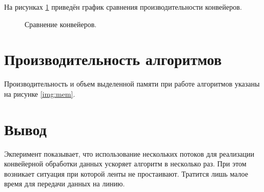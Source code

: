 На рисунках \ref{plt:time} приведён график сравнения производительности конвейеров.

\begin{figure}[!hb]
	\centering
	\captionsetup{justification=centering}
	\caption{Сравнение конвейеров.}
	\label{plt:time}
\end{figure}


\newpage
\section{Производительность алгоритмов}

Производительность и объем выделенной памяти при работе алгоритмов указаны на рисунке \ref{img:mem}.


\section*{Вывод}

Экперимент показывает, что использование нескольких потоков для реализации конвейерной обработки данных ускоряет алгоритм в несколько раз. При этом возникает ситуация при которой ленты не простаивают. Тратится лишь малое время для передачи данных на линию.
